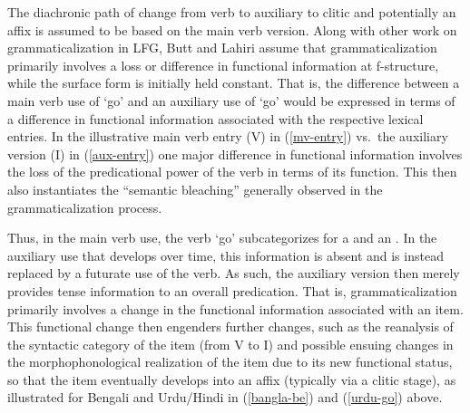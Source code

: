 \documentclass[output=paper,hidelinks]{langscibook}
\begin{document}
\ea \label{main-light}
\z


The diachronic path of change from  verb to auxiliary to clitic and potentially an affix is assumed to be based on the main verb version. 
Along with other work on grammaticalization in LFG, Butt and Lahiri assume that grammaticalization primarily involves a loss or difference in functional information at f-structure, while the surface form is initially held constant. That is, the difference between a main verb use of `go' and an auxiliary use of `go' would be expressed in terms of a difference in functional information associated with the respective lexical entries.  In the illustrative main verb entry (V) in (\ref{mv-entry}) vs.~the auxiliary version (I) in (\ref{aux-entry}) one major difference in functional information involves the loss of the predicational power of the verb in terms of its \PRED function.  This then also instantiates the ``semantic bleaching'' generally observed in the grammaticalization process.

\begin{exe}
  \ex 
  \begin{xlist}
\ex  \label{mv-entry}
\ex \label{aux-entry}
\end{xlist}
\end{exe}


Thus, in the main verb use, the verb `go'  subcategorizes for a \SUBJ and an \XCOMP.  In the auxiliary use that develops over time, this information is absent and is instead replaced by a futurate use of the verb. As such, the auxiliary version then merely provides tense information to an overall predication. That is, grammaticalization  primarily involves a change in the functional information associated with an item.  This functional change then engenders further changes, such as the reanalysis of the syntactic category of the item (from V to I) and possible ensuing changes in the morphophonological realization of the item due to its new functional status, so that the item eventually develops into an affix (typically via a clitic stage), as illustrated for Bengali and Urdu/Hindi in (\ref{bangla-be}) and (\ref{urdu-go}) above. 
\end{document}
